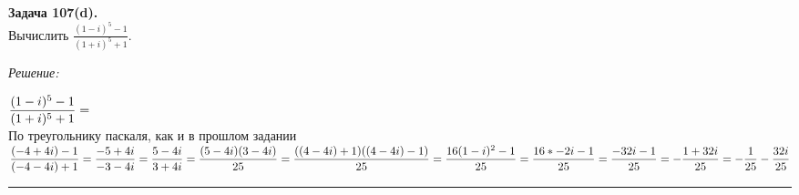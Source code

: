 \documentclass[a4paper, 12pt]{article}
\newenvironment{problem}[2][Задача]
    { \begin{mdframed}[backgroundcolor=gray!10] \textbf{#1 #2.} \\}
    {  \end{mdframed}}
\newenvironment{solution}
    {\textit{Решение: }}
    {\noindent\rule{7in}{1.5pt}}
\begin{document}
\begin{problem}{107(d)}
Вычислить $\displaystyle\frac{(1-i)^5-1}{(1+i)^5+1}$.
\end{problem}
\begin{solution}

$
\displaystyle\frac{(1 - i)^5 - 1}{(1 + i)^5 + 1} = \\
$
\\
По треугольнику паскаля, как и в прошлом задании
\\
$
\displaystyle\frac{(-4 + 4i) - 1}{(-4 - 4i) + 1} =
\displaystyle\frac{-5 + 4i}{-3 - 4i} =
\displaystyle\frac{5 - 4i}{3 + 4i} =
\displaystyle\frac{(5 - 4i)(3 - 4i)}{25} =
\displaystyle\frac{((4 - 4i) + 1)((4 - 4i) - 1)}{25} = \\
\displaystyle\frac{16(1 - i)^2 - 1}{25} =
\displaystyle\frac{16 * -2i - 1}{25} =
\displaystyle\frac{-32i - 1}{25} =
-\displaystyle\frac{1 + 32i}{25} =
-\displaystyle\frac{1}{25} - \displaystyle\frac{32i}{25}
$

\end{solution}
\end{document}
